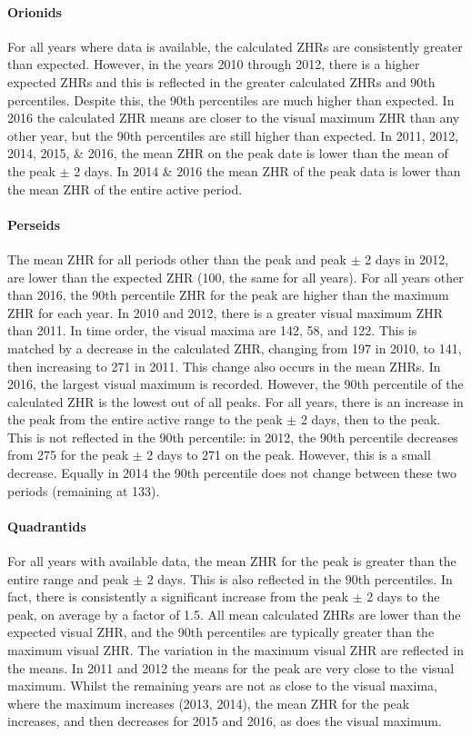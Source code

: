 \paragraph{Orionids\\}
For all years where data is available, the calculated ZHRs are consistently greater than expected. However, in the years 2010 through 2012, there is a higher expected ZHRs and this is reflected in the greater calculated ZHRs and 90th percentiles. Despite this, the 90th percentiles are much higher than expected. In 2016 the calculated ZHR means are closer to the visual maximum ZHR than any other year, but the 90th percentiles are still higher than expected. 
In 2011, 2012, 2014, 2015, \& 2016, the mean ZHR on the peak date is lower than the mean of the peak $\pm$ 2 days. In 2014 \& 2016 the mean ZHR of the peak data is lower than the mean ZHR of the entire active period.

\paragraph{Perseids\\}
The mean ZHR for all periods other than the peak and peak $\pm$ 2 days in 2012, are lower than the expected ZHR (100, the same for all years). For all years other than 2016, the 90th percentile ZHR for the peak are higher than the maximum ZHR for each year.
In 2010 and 2012, there is a greater visual maximum ZHR than 2011. In time order, the visual maxima are 142, 58, and 122. This is matched by a decrease in the calculated ZHR, changing from 197 in 2010, to 141, then increasing to 271 in 2011. This change also occurs in the mean ZHRs.
In 2016, the largest visual maximum is recorded. However, the 90th percentile of the calculated ZHR is the lowest out of all peaks.
For all years, there is an increase in the peak from the entire active range to the peak $\pm$ 2 days, then to the peak. This is not reflected in the 90th percentile: in 2012, the 90th percentile decreases from 275 for the peak $\pm$ 2 days to 271 on the peak. However, this is a small decrease. Equally in 2014 the 90th percentile does not change between these two periods (remaining at 133).

\paragraph{Quadrantids\\}
For all years with available data, the mean ZHR for the peak is greater than the entire range and peak $\pm$ 2 days. This is also reflected in the 90th percentiles. In fact, there is consistently a significant increase from the peak $\pm$ 2 days to the peak, on average by a factor of 1.5. All mean calculated ZHRs are lower than the expected visual ZHR, and the 90th percentiles are typically greater than the maximum visual ZHR.
The variation in the maximum visual ZHR are reflected in the means. In 2011 and 2012 the means for the peak are very close to the visual maximum. Whilst the remaining years are not as close to the visual maxima, where the maximum increases (2013, 2014), the mean ZHR for the peak increases, and then decreases for 2015 and 2016, as does the visual maximum.

